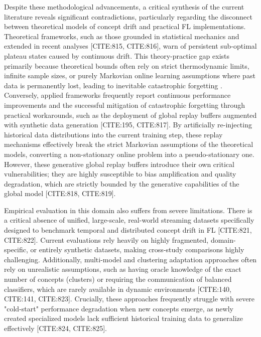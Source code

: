 \documentclass[journal]{IEEEtran}
\begin{document}
Despite these methodological advancements, a critical synthesis of the current literature reveals significant contradictions, particularly regarding the disconnect between theoretical models of concept drift and practical FL implementations. Theoretical frameworks, such as those grounded in statistical mechanics \cite{Straat2018} and extended in recent analyses [CITE:815, CITE:816], warn of persistent sub-optimal plateau states caused by continuous drift. This theory-practice gap exists primarily because theoretical bounds often rely on strict thermodynamic limits, infinite sample sizes, or purely Markovian online learning assumptions where past data is permanently lost, leading to inevitable catastrophic forgetting \cite{paper820}. Conversely, applied frameworks frequently report continuous performance improvements and the successful mitigation of catastrophic forgetting through practical workarounds, such as the deployment of global replay buffers augmented with synthetic data generation [CITE:195, CITE:817]. By artificially re-injecting historical data distributions into the current training step, these replay mechanisms effectively break the strict Markovian assumptions of the theoretical models, converting a non-stationary online problem into a pseudo-stationary one. However, these generative global replay buffers introduce their own critical vulnerabilities; they are highly susceptible to bias amplification and quality degradation, which are strictly bounded by the generative capabilities of the global model [CITE:818, CITE:819]. 

Empirical evaluation in this domain also suffers from severe limitations. There is a critical absence of unified, large-scale, real-world streaming datasets specifically designed to benchmark temporal and distributed concept drift in FL [CITE:821, CITE:822]. Current evaluations rely heavily on highly fragmented, domain-specific, or entirely synthetic datasets, making cross-study comparisons highly challenging. Additionally, multi-model and clustering adaptation approaches often rely on unrealistic assumptions, such as having oracle knowledge of the exact number of concepts (clusters) or requiring the communication of balanced classifiers, which are rarely available in dynamic environments [CITE:140, CITE:141, CITE:823]. Crucially, these approaches frequently struggle with severe "cold-start" performance degradation when new concepts emerge, as newly created specialized models lack sufficient historical training data to generalize effectively [CITE:824, CITE:825].
\end{document}
